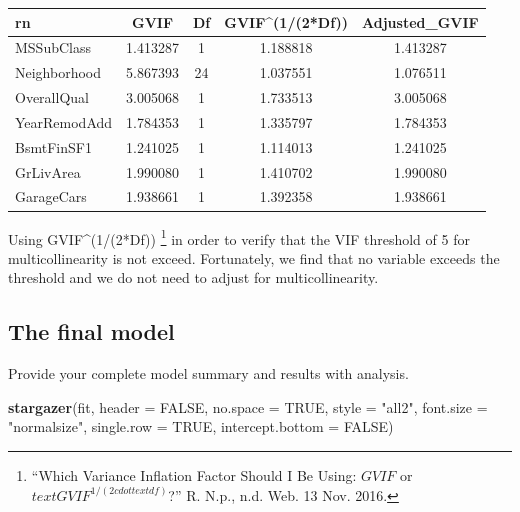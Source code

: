 \documentclass[]{article}
\newenvironment{Shaded}{\begin{snugshade}}{\end{snugshade}}
\newcommand{\KeywordTok}[1]{\textcolor[rgb]{0.13,0.29,0.53}{\textbf{{#1}}}}
\newcommand{\DataTypeTok}[1]{\textcolor[rgb]{0.13,0.29,0.53}{{#1}}}
\newcommand{\DecValTok}[1]{\textcolor[rgb]{0.00,0.00,0.81}{{#1}}}
\newcommand{\StringTok}[1]{\textcolor[rgb]{0.31,0.60,0.02}{{#1}}}
\newcommand{\OtherTok}[1]{\textcolor[rgb]{0.56,0.35,0.01}{{#1}}}
\newcommand{\NormalTok}[1]{{#1}}
\let\rmarkdownfootnote\footnote%
\def\footnote{\protect\rmarkdownfootnote}
\begin{document}
\begin{Shaded}
\end{Shaded}

\begin{longtable}[]{@{}lcccc@{}}
\toprule
rn & GVIF & Df & GVIF\^{}(1/(2*Df)) & Adjusted\_GVIF\tabularnewline
\midrule
\endhead
MSSubClass & 1.413287 & 1 & 1.188818 & 1.413287\tabularnewline
Neighborhood & 5.867393 & 24 & 1.037551 & 1.076511\tabularnewline
OverallQual & 3.005068 & 1 & 1.733513 & 3.005068\tabularnewline
YearRemodAdd & 1.784353 & 1 & 1.335797 & 1.784353\tabularnewline
BsmtFinSF1 & 1.241025 & 1 & 1.114013 & 1.241025\tabularnewline
GrLivArea & 1.990080 & 1 & 1.410702 & 1.990080\tabularnewline
GarageCars & 1.938661 & 1 & 1.392358 & 1.938661\tabularnewline
\bottomrule
\end{longtable}

Using GVIF\^{}(1/(2*Df)) \footnote{``Which Variance Inflation Factor
  Should I Be Using: \(GVIF\) or \(text{GVIF}^{1/(2cdottext{df})}\)?''
  R. N.p., n.d. Web. 13 Nov. 2016.} in order to verify that the VIF
threshold of 5 for multicollinearity is not exceed. Fortunately, we find
that no variable exceeds the threshold and we do not need to adjust for
multicollinearity.

\subsection{The final model}\label{the-final-model}

Provide your complete model summary and results with analysis.

\begin{Shaded}
\begin{Highlighting}[]
\KeywordTok{stargazer}\NormalTok{(fit, }\DataTypeTok{header =} \OtherTok{FALSE}\NormalTok{, }\DataTypeTok{no.space =} \OtherTok{TRUE}\NormalTok{, }
          \DataTypeTok{style =} \StringTok{"all2"}\NormalTok{, }\DataTypeTok{font.size =} \StringTok{"normalsize"}\NormalTok{, }
          \DataTypeTok{single.row =} \OtherTok{TRUE}\NormalTok{, }\DataTypeTok{intercept.bottom =} \OtherTok{FALSE}\NormalTok{)}
\end{Highlighting}
\end{Shaded}
\end{document}
